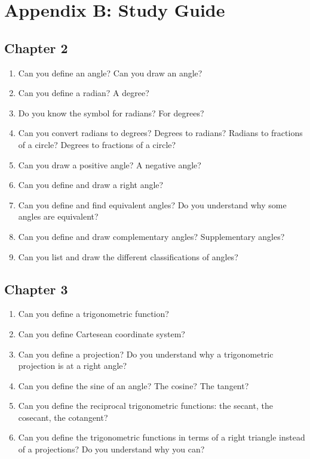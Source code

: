 \section{Appendix B:  Study Guide}

\subsection{Chapter 2}
\begin{enumerate}

\item{Can you define an angle?  Can you draw an angle?}

\item{Can you define a radian?  A degree?}

\item{Do you know the symbol for radians?  For degrees?}

\item{Can you convert radians to degrees?  Degrees to radians?  Radians to fractions of a circle?  Degrees to fractions of a circle?}

\item{Can you draw a positive angle?  A negative angle?}

\item {Can you define and draw a right angle?}

\item{Can you define and find equivalent angles?  Do you understand why some angles are equivalent?}

\item{Can you define and draw complementary angles?  Supplementary angles?}

\item{Can you list and draw the different classifications of angles?}

\end{enumerate}
\subsection{Chapter 3}
\begin{enumerate}

\item{Can you define a trigonometric function?}

\item{Can you define Cartesean coordinate system?}

\item{Can you define a projection?  Do you understand why a trigonometric projection is at a right angle?}

\item{Can you define the sine of an angle?  The cosine? The tangent?}

\item{Can you define the reciprocal trigonometric functions:  the secant, the cosecant, the cotangent?}

\item{Can you define the trigonometric functions in terms of a right triangle instead of a projections?  Do you understand why you can?}

\end{enumerate}
